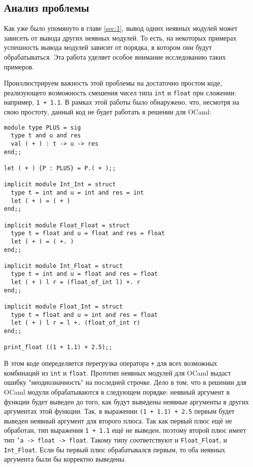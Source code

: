 \documentclass[../diploma.tex]{subfiles}
\begin{document}
\label{sec:3}

\subsection{Анализ проблемы}

Как уже было упомянуто в главе \ref{sec:1}, вывод одних неявных модулей может зависеть от вывода других неявных модулей. То есть, на некоторых примерах успешность вывода модулей зависит от порядка, в котором они будут обрабатываться. Эта работа уделяет особое внимание исследованию таких примеров.

Проиллюстрируем важность этой проблемы на достаточно простом коде, реализующего возможность смешения чисел типа \texttt{int} и \texttt{float} при сложении: например, \texttt{1 + 1.1}. В рамках этой работы было обнаружено, что, несмотря на свою простоту, данный код не будет работать в решении для OCaml:

\begin{verbatim}
module type PLUS = sig
  type t and u and res
  val ( + ) : t -> u -> res
end;;

let ( + ) {P : PLUS} = P.( + );;

implicit module Int_Int = struct
  type t = int and u = int and res = int
  let ( + ) = ( + )
end;;

implicit module Float_Float = struct
  type t = float and u = float and res = float
  let ( + ) = ( +. )
end;;

implicit module Int_Float = struct
  type t = int and u = float and res = float
  let ( + ) l r = (float_of_int l) +. r
end;;

implicit module Float_Int = struct
  type t = float and u = int and res = float
  let ( + ) l r = l +. (float_of_int r)
end;;

print_float ((1 + 1.1) + 2.5);;
\end{verbatim}

В этом коде опеределяется перегрузка оператора \texttt{+} для всех возможных комбинаций из \texttt{int} и \texttt{float}. Прототип неявных модулей для OCaml выдаст ошибку "неоднозначность" на последней строчке. Дело в том, что в решении для OCaml модули обрабатываются в следующем порядке: неявный аргумент в функции будет выведен до того, как будут выведены неявные аргументы в других аргументах этой функции. Так, в выражении \texttt{(1 + 1.1) + 2.5} первым будет выведен неявный аргумент для второго плюса. Так как первый плюс ещё не обработан, тип выражения \texttt{1 + 1.1} ещё не выведен, поэтому второй плюс имеет тип \texttt{'a -> float -> float}. Такому типу соответствуют и \texttt{Float_Float}, и \texttt{Int_Float}. Если бы первый плюс обрабатывался первым, то оба неявных аргумента были бы корректно выведены.
\end{document}
